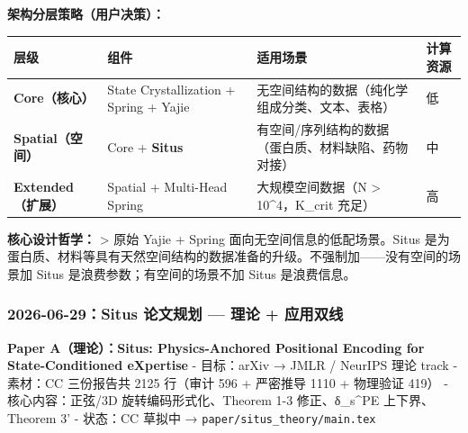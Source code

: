 \documentclass[
  12pt,
]{ctexart}
\begin{document}
\textbf{架构分层策略（用户决策）：}

\begin{longtable}[]{@{}
  >{\raggedright\arraybackslash}p{}
  >{\raggedright\arraybackslash}p{}
  >{\raggedright\arraybackslash}p{}
  >{\raggedright\arraybackslash}p{}@{}}
\toprule\noalign{}
\begin{minipage}[b]{\linewidth}\raggedright
层级
\end{minipage} & \begin{minipage}[b]{\linewidth}\raggedright
组件
\end{minipage} & \begin{minipage}[b]{\linewidth}\raggedright
适用场景
\end{minipage} & \begin{minipage}[b]{\linewidth}\raggedright
计算资源
\end{minipage} \\
\midrule\noalign{}
\endhead
\bottomrule\noalign{}
\endlastfoot
\textbf{Core（核心）} & State Crystallization + Spring + Yajie &
无空间结构的数据（纯化学组成分类、文本、表格） & 低 \\
\textbf{Spatial（空间）} & Core + \textbf{Situs} &
有空间/序列结构的数据（蛋白质、材料缺陷、药物对接） & 中 \\
\textbf{Extended（扩展）} & Spatial + Multi-Head Spring &
大规模空间数据（N \textgreater{} 10\^{}4，K\_crit 充足） & 高 \\
\end{longtable}

\textbf{核心设计哲学：} \textgreater{} 原始 Yajie + Spring
面向无空间信息的低配场景。Situs
是为蛋白质、材料等具有天然空间结构的数据准备的升级。不强制加------没有空间的场景加
Situs 是浪费参数；有空间的场景不加 Situs 是浪费信息。

\subsubsection{2026-06-29：Situs 论文规划 --- 理论 +
应用双线}\label{situs-ux8bbaux6587ux89c4ux5212-ux7406ux8bba-ux5e94ux7528ux53ccux7ebf}

\textbf{Paper A（理论）：Situs: Physics-Anchored Positional Encoding for
State-Conditioned eXpertise} - 目标：arXiv → JMLR / NeurIPS 理论 track -
素材：CC 三份报告共 2125 行（审计 596 + 严密推导 1110 + 物理验证 419） -
核心内容：正弦/3D 旋转编码形式化、Theorem 1-3 修正、δ\_s\^{}PE
上下界、Theorem 3' - 状态：CC 草拟中 →
\texttt{paper/situs\_theory/main.tex}
\end{document}
